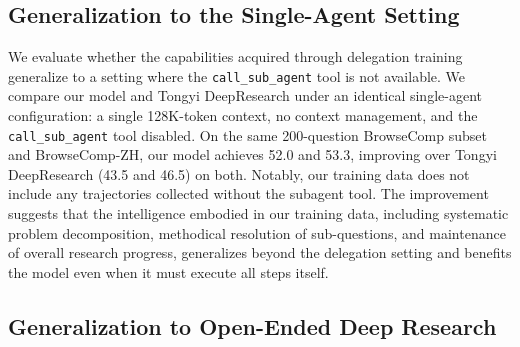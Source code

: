 \documentclass{llmxive}
\begin{document}
\subsection{Generalization to the Single-Agent Setting}

We evaluate whether the capabilities acquired through delegation training generalize to a setting where the \texttt{call\_sub\_agent} tool is not available. We compare our model and Tongyi DeepResearch under an identical single-agent configuration: a single 128K-token context, no context management, and the \texttt{call\_sub\_agent} tool disabled. On the same 200-question BrowseComp subset and BrowseComp-ZH, our model achieves 52.0 and 53.3, improving over Tongyi DeepResearch (43.5 and 46.5) on both. Notably, our training data does not include any trajectories collected without the subagent tool. The improvement suggests that the intelligence embodied in our training data, including systematic problem decomposition, methodical resolution of sub-questions, and maintenance of overall research progress, generalizes beyond the delegation setting and benefits the model even when it must execute all steps itself.

\subsection{Generalization to Open-Ended Deep Research}
\end{document}
